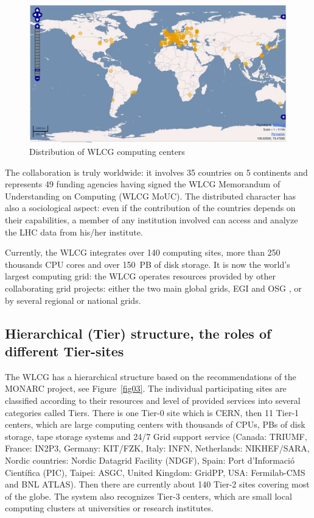 \begin{figure}[htb] %
\centering
\includegraphics[width=13cm]{fig02.eps} %
\caption{Distribution of WLCG computing centers}\label{fig02}
\end{figure}



The collaboration is truly worldwide: it involves 35 countries on 5
continents and represents 49 funding agencies having signed the WLCG
Memorandum of Understanding on Computing (WLCG MoUC)\cite{MoU}. The
distributed character has also a sociological aspect: even if the contribution 
of the countries depends on  their capabilities, a member of any
institution involved can access and analyze the LHC data from
his/her institute.

Currently, the WLCG integrates over 140 computing sites, more than
250 thousands CPU cores and over 150~PB of disk storage. It is now
the world's largest computing grid: the WLCG operates resources
provided by other collaborating grid projects: either the two main
global grids, EGI \cite{EGI} and OSG \cite{OSG}, or by several regional or
national grids.

\subsection{Hierarchical (Tier) structure, the roles of different
Tier-sites}
%
The WLCG has a hierarchical structure based on the
recommendations of the  MONARC project\cite{MONARC}, see Figure~\ref{fig03}.
The individual participating sites are  classified according to their
resources and level of provided services into several categories
called Tiers. There is one Tier-0 site  which is CERN, then 11 Tier-1
centers, which are large computing centers with thousands of CPUs,
PBs of disk storage, tape storage  systems and 24/7 Grid support
service (Canada: TRIUMF, France: IN2P3, Germany: KIT/FZK,  Italy: INFN,
 Netherlands: NIKHEF/SARA,  Nordic countries: Nordic Datagrid Facility (NDGF), 
Spain: Port d'Informaci\'o
Cient\'ifica (PIC),  Taipei:
ASGC, United Kingdom: GridPP,  USA: Fermilab-CMS and BNL ATLAS).
Then there are currently about 140 Tier-2 sites covering most of the
globe. The system also recognizes Tier-3 centers, which are small
local computing clusters at universities or research institutes.

